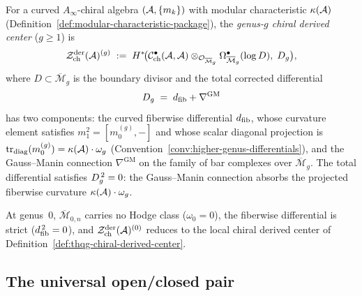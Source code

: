 \begin{definition}
\label{def:genus-g-derived-center}
For a curved $A_\infty$-chiral algebra $(\mathcal{A}, \{m_k\})$ with
modular characteristic $\kappa(\mathcal{A})$
(Definition~\ref{def:modular-characteristic-package}), the
\emph{genus-$g$ chiral derived center} ($g \geq 1$) is
\begin{equation}\label{eq:genus-g-derived-center}
\mathcal{Z}^{\mathrm{der}}_{\mathrm{ch}}(\mathcal{A})^{(g)}
\;:=\;
H^*\!\bigl(
\mathcal{C}^{\bullet}_{\mathrm{ch}}(\mathcal{A}, \mathcal{A})
\otimes_{\mathcal{O}_{\overline{\mathcal{M}}_g}}
\Omega^{\bullet}_{\overline{\mathcal{M}}_g}(\log D),
\;D_{g}
\bigr),
\end{equation}
where $D \subset \overline{\mathcal{M}}_g$ is the boundary divisor
and the total corrected differential
\begin{equation}\label{eq:Dg-decomposition}
D_{g} \;=\; d_{\mathrm{fib}} + \nabla^{\mathrm{GM}}
\end{equation}
has two components: the curved fiberwise differential $d_{\mathrm{fib}}$, whose
curvature element satisfies $m_1^2=[m_0^{(g)},-]$ and whose scalar
diagonal projection is
$\operatorname{tr}_{\mathrm{diag}}(m_0^{(g)})
=\kappa(\mathcal{A})\cdot\omega_g$
(Convention~\ref{conv:higher-genus-differentials}), and the
Gauss--Manin connection $\nabla^{\mathrm{GM}}$ on the family of
bar complexes over $\overline{\mathcal{M}}_g$. The total
differential satisfies $D_{g}^{\,2} = 0$: the Gauss--Manin
connection absorbs the projected fiberwise curvature
$\kappa(\mathcal{A}) \cdot \omega_g$.

At genus~$0$, $\overline{\mathcal{M}}_{0,n}$ carries no Hodge
class ($\omega_0 = 0$), the fiberwise differential is strict
($d_{\mathrm{fib}}^{\,2} = 0$), and
$\mathcal{Z}^{\mathrm{der}}_{\mathrm{ch}}(\mathcal{A})^{(0)}$ reduces
to the local chiral derived center of
Definition~\ref{def:thqg-chiral-derived-center}.
\end{definition}

\subsection{The universal open/closed pair}
\label{subsec:thqg-universal-oc-pair}

